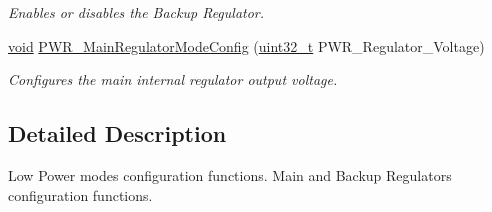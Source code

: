 \begin{DoxyCompactItemize}
\begin{DoxyCompactList}\small\item\em Enables or disables the Backup Regulator. \end{DoxyCompactList}\item 
\hyperlink{group___n_a_m_e_ga18028b8badbf1ea7e704ccac3c488e82}{void} \hyperlink{group___p_w_r___group4_gada193dea79762f379d4e666a98f28d89}{P\-W\-R\-\_\-\-Main\-Regulator\-Mode\-Config} (\hyperlink{stdint_8h_a435d1572bf3f880d55459d9805097f62}{uint32\-\_\-t} P\-W\-R\-\_\-\-Regulator\-\_\-\-Voltage)
\begin{DoxyCompactList}\small\item\em Configures the main internal regulator output voltage. \end{DoxyCompactList}\end{DoxyCompactItemize}


\subsection{Detailed Description}
Low Power modes configuration functions. Main and Backup Regulators configuration functions.

